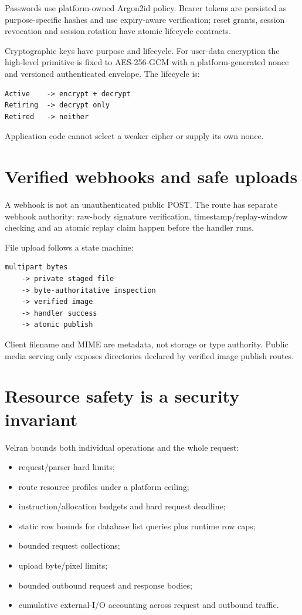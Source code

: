 Passwords use platform-owned Argon2id policy. Bearer tokens are persisted as purpose-specific hashes and use expiry-aware verification; reset grants, session revocation and session rotation have atomic lifecycle contracts.

Cryptographic keys have purpose and lifecycle. For user-data encryption the high-level primitive is fixed to AES-256-GCM with a platform-generated nonce and versioned authenticated envelope. The lifecycle is:

\begin{lstlisting}
Active    -> encrypt + decrypt
Retiring  -> decrypt only
Retired   -> neither
\end{lstlisting}

Application code cannot select a weaker cipher or supply its own nonce.

\section{Verified webhooks and safe uploads}

A webhook is not an unauthenticated public POST. The route has separate webhook authority: raw-body signature verification, timestamp/replay-window checking and an atomic replay claim happen before the handler runs.

File upload follows a state machine:

\begin{lstlisting}
multipart bytes
    -> private staged file
    -> byte-authoritative inspection
    -> verified image
    -> handler success
    -> atomic publish
\end{lstlisting}

Client filename and MIME are metadata, not storage or type authority. Public media serving only exposes directories declared by verified image publish routes.

\section{Resource safety is a security invariant}

Velran bounds both individual operations and the whole request:

\begin{itemize}
  \item request/parser hard limits;
  \item route resource profiles under a platform ceiling;
  \item instruction/allocation budgets and hard request deadline;
  \item static row bounds for database list queries plus runtime row caps;
  \item bounded request collections;
  \item upload byte/pixel limits;
  \item bounded outbound request and response bodies;
  \item cumulative external-I/O accounting across request and outbound traffic.
\end{itemize}

